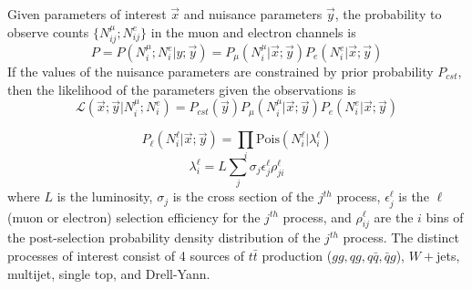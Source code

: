 \documentclass{article}
\newcommand{\lik}{\mathcal{L}}
\newcommand{\interest}{\vec{x}}
\newcommand{\nuis}{\vec{y}}
\begin{document}
Given parameters of interest $\interest$ and nuisance parameters
$\nuis$, the probability to observe counts $\{N_{ij}^{\mu};N_{ij}^e\}$
in the muon and electron channels is
\[P 
= P\left(N_i^{\mu};N_i^e | y;\nuis\right) =
P_{\mu}\left(N_i^{\mu}|\interest;\nuis\right)P_e\left(N_i^e|\interest;\nuis\right)\]
If the values of the nuisance parameters are constrained by prior
probability $P_{cst}$, then the likelihood of the parameters given the
observations is
\begin{equation}
  \lik\left(\interest;\nuis|N_i^{\mu};N_i^e\right) = P_{cst}(\nuis)P_{\mu}(N_i^\mu|\interest;\nuis)P_e(N_i^e|\interest;\nuis)
\end{equation}


\begin{equation}
  P_\ell\left(N_i^\ell|\interest;\nuis\right) = \prod_i \mathrm{Pois}\left(N_i^\ell|\lambda_i^\ell\right)
\end{equation}
\begin{equation}
  \lambda_i^\ell = L\sum_j\sigma_j\epsilon_j^\ell\rho_{ji}^\ell
\end{equation}
where $L$ is the luminosity, $\sigma_j$ is the cross section of the
$j^{th}$ process, $\epsilon^\ell_j$ is the $\ell$ (muon or electron)
selection efficiency for the $j^{th}$ process, and $\rho^\ell_{ij}$
are the $i$ bins of the post-selection probability density
distribution of the $j^{th}$ process.  The distinct processes of
interest consist of 4 sources of $t\bar{t}$ production
($gg,qg,q\bar{q},\bar{q}g$), $W+$jets, multijet, single top, and
Drell-Yann.
\end{document}
